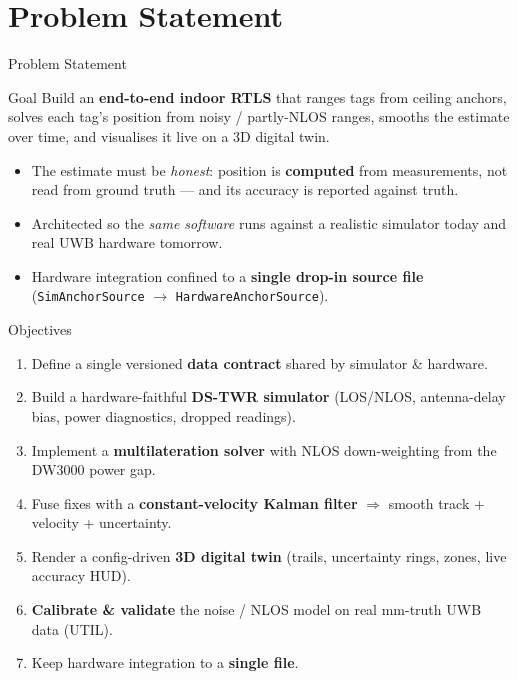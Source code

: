 \documentclass[aspectratio=169,10pt]{beamer}
\begin{document}
\section{Problem Statement}
\begin{frame}{Problem Statement}
  \begin{block}{Goal}
    Build an \textbf{end-to-end indoor RTLS} that ranges tags from ceiling anchors,
    \alert{solves} each tag's position from noisy / partly-NLOS ranges, \alert{smooths}
    the estimate over time, and \alert{visualises} it live on a 3D digital twin.
  \end{block}
  \begin{itemize}
    \item The estimate must be \emph{honest}: position is \textbf{computed} from measurements,
          not read from ground truth --- and its accuracy is reported against truth.
    \item Architected so the \emph{same software} runs against a realistic simulator today
          and real UWB hardware tomorrow.
    \item Hardware integration confined to a \textbf{single drop-in source file}
          (\texttt{SimAnchorSource} $\rightarrow$ \texttt{HardwareAnchorSource}).
  \end{itemize}
\end{frame}

\begin{frame}{Objectives}
  \begin{enumerate}
    \item Define a single versioned \textbf{data contract} shared by simulator \& hardware.
    \item Build a hardware-faithful \textbf{DS-TWR simulator} (LOS/NLOS, antenna-delay bias,
          power diagnostics, dropped readings).
    \item Implement a \textbf{multilateration solver} with NLOS down-weighting from the DW3000 power gap.
    \item Fuse fixes with a \textbf{constant-velocity Kalman filter}
          $\Rightarrow$ smooth track + velocity + uncertainty.
    \item Render a config-driven \textbf{3D digital twin} (trails, uncertainty rings,
          zones, live accuracy HUD).
    \item \textbf{Calibrate \& validate} the noise / NLOS model on real mm-truth UWB data (UTIL).
    \item Keep hardware integration to a \textbf{single file}.
  \end{enumerate}
\end{frame}
\end{document}
